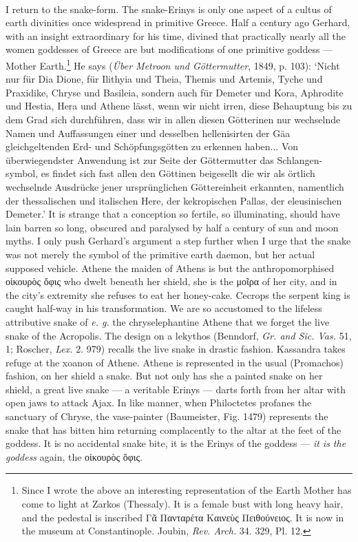 \documentclass[a4paper, 11pt, oneside, polutonikogreek, english]{article}
\begin{document}
\paragraph{}
I return to the snake-form. The snake-Erinys is only one aspect of a cultus of earth divinities once widespread in primitive Greece. Half a century ago Gerhard, with an insight extraordinary for his time, divined that practically nearly all the women goddesses of Greece are but modifications of one primitive goddess --- Mother Earth.\footnote{Since I wrote the above an interesting representation of the Earth Mother has come to  light at Zarkos (Thessaly). It is a female bust with long heavy hair, and the pedestal is inscribed Γᾶ Πανταρέτα Καινεὺς Πειθούνειος. It is now in the museum at Constantinople. Joubin,
\emph{Rev. Arch.} 34. 329, Pl. 12.} He says (\emph{Über Metroon und Göttermutter}, 1849, p. 103): `Nicht nur für Dia Dione, für Ilithyia und Theia, Themis und Artemis, Tyche und Praxidike, Chryse und Basileia, sondern auch für Demeter und Kora, Aphrodite und Hestia, Hera und Athene lässt, wenn wir nicht irren, diese Behauptung bis zu dem Grad sich durchführen, dass wir in allen diesen Götterinen nur wechselnde Namen und Auffassungen einer und desselben hellenisirten der Gäa gleichgeltenden Erd- und Schöpfungsgötten zu erkennen haben... Von überwiegendster Anwendung ist zur Seite der Göttermutter das Schlangen-symbol, es findet sich fast allen den Göttinen beigesellt die wir als örtlich wechselnde Ausdrücke jener ursprünglichen Göttereinheit erkannten, namentlich der thessalischen und italischen Here, der kekropischen Pallas, der eleusinischen Demeter.' It is strange that a conception so fertile, so illuminating, should have lain barren so long, obscured and paralysed by half a century of sun and moon myths. I only push Gerhard's argument a step further when I urge that the snake was not merely the symbol of the primitive earth daemon, but her actual supposed vehicle. Athene the maiden of Athens is but the anthropomorphised οἰκουρὸς ὄφις who dwelt beneath her shield, she is the μοῖρα of her city, and in the city's extremity she refuses to eat her honey-cake. Cecrops the serpent king is caught half-way in his transformation. We are so accustomed to the lifeless attributive snake of \emph{e. g.} the chryselephantine Athene that we forget the live snake of the Acropolis. The design on a lekythos (Benndorf, \emph{Gr. and Sic. Vas.} 51, 1; Roscher, \emph{Lex.} 2. 979) recalls the live snake in drastic fashion. Kassandra takes refuge at the xoanon of Athene. Athene is represented in the usual (Promachos) fashion, on her shield a snake. But not only has she a painted snake on her shield, a great live snake --- a veritable Erinys --- darts forth from her altar with open jaws to attack Ajax. In like manner, when Philoctetes profanes the sanctuary of Chryse, the vase-painter (Baumeister, Fig. 1479) represents the snake that has bitten him returning complacently to the altar at the feet of the goddess. It is no accidental snake bite, it is the Erinys of the goddess --- \emph{it is the goddess} again, the οἰκουρὸς ὄφις.
\end{document}
